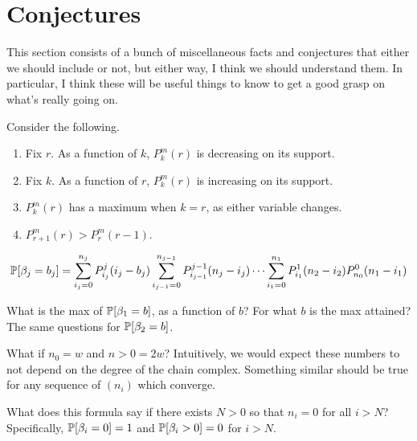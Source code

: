 \section{Conjectures}
This section consists of a bunch of miscellaneous facts and conjectures that
either we should include or not, but either way, I think we should understand
them. In particular, I think these will be useful things to know to get a good
grasp on what's really going on. 

\begin{conjecture}
 Consider the following.
  \begin{enumerate}
    \item Fix $r$. As a function of $k$, $P^m_k(r)$ is decreasing on its support.
    \item Fix $k$. As a function of $r$, $P^m_k(r)$ is increasing on its support.
    \item $P^m_k(r)$ has a maximum when $k = r$, as either variable changes.
    \item $P^m_{r+1}(r) > P^m_r(r-1)$.
  \end{enumerate}
\end{conjecture}


\begin{theorem}
  \[
    \mathbb{P}[\beta_j = b_j] = \sum_{i_j=0}^{n_j} P^j_{i_j}(i_j-b_j)
    \sum_{i_{j-1}=0}^{n_{j-1}} P^{j-1}_{i_{j-1}}(n_j-i_j) \cdots
    \sum_{i_1=0}^{n_1}P^1_{i_1}(n_2-i_2)
    P^0_{n_0}(n_1-i_1)
  \]
\end{theorem}

\begin{question} 
  What is the max of $\mathbb{P}[\beta_1=b]$, as a function of $b$? For
  what $b$ is the max attained? The same questions for $\mathbb{P}[\beta_2=b]$.
\end{question}

\begin{question}
  What if $n_0 = w$ and $n>0 = 2w$? Intuitively, we would expect these numbers
  to not depend on the degree of the chain complex. Something similar should
  be true for any sequence of $(n_i)$ which converge.
\end{question}

\begin{question}
  What does this formula say if there exists $N >0$ so that $n_i=0$ for 
  all $i > N$? Specifically, $\mathbb{P}[\beta_i=0] = 1$ and $\mathbb{P}[\beta_i > 0]= 0$ 
  for $i>N$.
\end{question}

